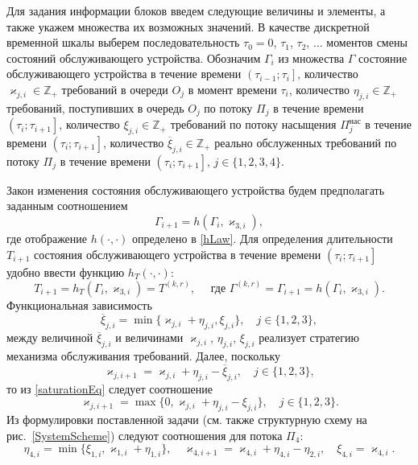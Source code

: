\documentclass[a4paper,12pt,russian]{extarticle}
\begin{document}
Для задания информации блоков введем следующие величины и элементы, а также укажем множества их возможных значений. В качестве дискретной временной шкалы выберем последовательность $\tau_0=0$, $\tau_1$, $\tau_2$, $\ldots$ моментов смены состояний обслуживающего устройства. Обозначим $\Gamma_i$ из множества $\Gamma$ состояние обслуживающего устройства в течение времени $\left(\tau_{i-1};\tau_i\right]$, количество $\varkappa_{j,i} \in \mathbb{Z}_+ $ требований в очереди $O_j$ в момент времени $\tau_i$, количество $\eta_{j,i} \in \mathbb{Z}_+$ требований, поступивших в очередь $O_j$ по потоку $\Pi_j$ в течение времени $\left(\tau_{i};\tau_{i+1}\right]$, количество $\xi_{j,i} \in \mathbb{Z}_+$ требований по потоку насыщения $\Pi^{\mathrm{\text{нас}}}_j$ в течение времени $\left(\tau_{i};\tau_{i+1}\right]$, количество $\overline{\xi}_{j,i}\in \mathbb{Z}_+$ реально обслуженных требований по потоку $\Pi_j$ в течение времени $\left(\tau_{i};\tau_{i+1}\right]$, $j\in \{1,2,3,4\}$.

Закон изменения состояния обслуживающего устройства будем предполагать заданным соотношением 
\begin{equation}
\Gamma_{i+1}=h(\Gamma_i,\varkappa_{3,i}),
\label{gammaFunc}
\end{equation}
где отображение $h(\cdot,\cdot)$ определено в \eqref{hLaw}.
Для определения длительности $T_{i+1}$ состояния обслуживающего устройства в течение времени $\left(\tau_{i};\tau_{i+1}\right]$ удобно ввести функцию $h_T(\cdot,\cdot)$:
\begin{equation*}
T_{i+1}=h_T(\Gamma_i,\varkappa_{3,i})= T^{(k,r)},\quad  \text{ где } \Gamma^{(k,r)}=\Gamma_{i+1}=h(\Gamma_i,\varkappa_{3,i}).
\end{equation*}
Функциональная зависимость
\begin{equation}
\overline{\xi}_{j,i}=\min\{\varkappa_{j,i}+\eta_{j,i},\xi_{j,i}\}, \quad j\in \{1,2,3\},
\label{saturationEq}
\end{equation}
между величиной $\overline{\xi}_{j,i}$ и величинами $\varkappa_{j,i}$, $\eta_{j,i}$, $\xi_{j,i}$ реализует стратегию механизма обслуживания требований. Далее, поскольку 
\begin{equation*}
\varkappa_{j,i+1}=\varkappa_{j,i}+\eta_{j,i}-\overline{\xi}_{j,i}, \quad  j\in \{1,2,3\},
\end{equation*}
то из \eqref{saturationEq} следует соотношение
\begin{equation}
\varkappa_{j,i+1}=\max\{{0,\varkappa_{j,i}+\eta_{j,i}-\xi_{j,i}}\}, \quad j\in \{1,2,3\}.
\label{queuesFunc}
\end{equation}
Из формулировки поставленной задачи (см. также структурную схему на рис.~\ref{SystemScheme}) следуют соотношения для потока $\Pi_4$:
\begin{equation}
\eta_{4,i} = \min\{\xi_{1,i}, \varkappa_{1,i}+\eta_{1,i}\}, \quad \varkappa_{4,i+1}=\varkappa_{4,i}+\eta_{4,i}-\eta_{2,i}, \quad \xi_{4,i} = \varkappa_{4,i}.
\label{FourthFunc}
\end{equation}
\end{document}
